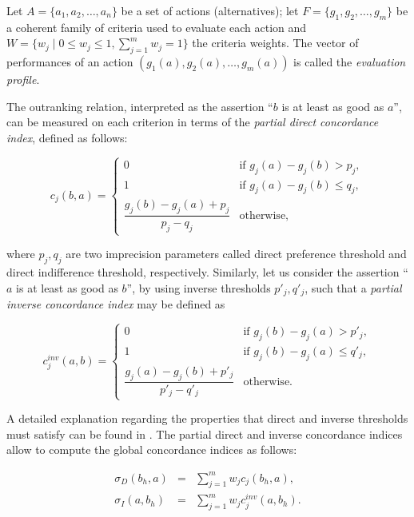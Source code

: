 \documentclass[]{elsarticle}
\theoremstyle{definition}
\begin{document}
Let $A=\{a_1,a_2,\ldots,a_n\}$ be a set of actions (alternatives);  let $F=\{g_1,g_2,\ldots,g_m\}$ be a coherent family of criteria used to evaluate each action and $W=\{w_j \mid 0 \leq w_j \leq 1, \sum_{j=1}^m w_j =1\}$ the criteria weights.  The vector of performances of an action  $(g_1(a),g_2(a),\ldots,g_m(a))$   is called the \emph{evaluation profile}. 



The outranking relation, interpreted as the assertion ``$b$ is at least as good as $a$'',  can be measured on each criterion in terms of  the \emph{partial direct concordance index}, defined as follows: 

{\footnotesize
\begin{equation}
c_j(b,a) =
\begin{cases}
	0							& \mbox{if  $g_j(a)-g_j(b) > p_j$}, \\
	1							& \mbox{if  $g_j(a)-g_j(b) \leq q_j$},   \\
	\dfrac{g_j(b)-g_j(a)+p_j}{p_j-q_j} 	& \mbox{otherwise}, 				     	      
 \end{cases} 
 \label{credibility}
 \end{equation} 
}

\noindent
where $p_j,q_j$ are two imprecision parameters called direct preference threshold and  direct indifference threshold, respectively.  Similarly,  let us consider the assertion ``$a$ is at least as good as $b$'', by using inverse thresholds $p'_j,q'_j$, such that a \emph{partial inverse concordance index} may be defined as 

{\fontsize{7}{7}
\begin{equation}
c^{inv}_j(a,b) =
\begin{cases}
	0							& \mbox{if  $g_j(b)-g_j(a) > p'_j$}, \\
	1							& \mbox{if  $g_j(b)-g_j(a) \leq q'_j$},   \\
	\dfrac{g_j(a)-g_j(b)+p'_j}{p'_j-q'_j} 	& \mbox{otherwise}. 				     	      
 \end{cases} 
 \label{invcredibility}
 \end{equation} 
}


\noindent
A detailed explanation regarding the properties that direct and inverse thresholds must satisfy can be found in \cite{roy2012}.  The partial direct and inverse concordance indices allow to compute the global concordance indices as follows:

\begin{eqnarray}
\sigma_D(b_h,a) 	&=& \sum_{j=1}^{m} w_j c_j(b_h,a),\label{generalsigmaDG}\\
\sigma_I(a,b_h) 	&=& \sum_{j=1}^{m} w_j c^{inv}_j(a,b_h). \label{generalsigmaIG}
\end{eqnarray} 
\end{document}
